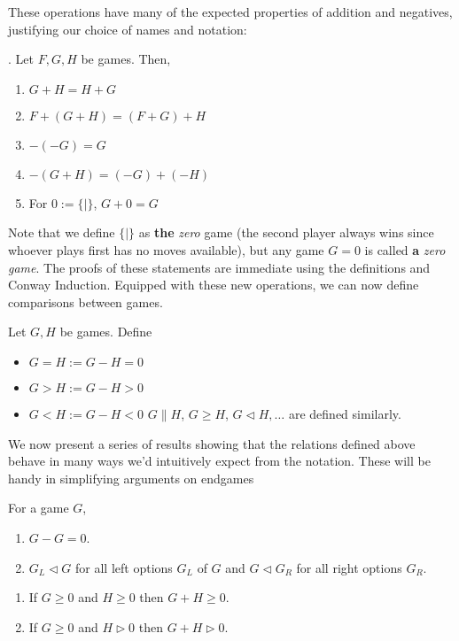 \documentclass[../math194_paper.tex]{subfiles}
\begin{document}
These operations have many of the expected properties of addition and negatives, justifying 
our choice of names and notation:
\begin{theorem}. Let $F,G,H$ be games. Then,
    \label{additionprop}
    \begin{enumerate}
        \item $G+H = H+G$
        \item $F + (G+H) = (F+G) + H$
        \item $-(-G) = G$
        \item $-(G+H) = (-G) + (-H)$
        \item For $0 := \{|\}$, $G+0=G$
    \end{enumerate}
\end{theorem}
Note that we define $\{ | \}$ as \textbf{the} \textit{zero} game (the second player always wins since 
whoever plays first has no moves available), but any game $G = 0$ is called \textbf{a} \textit{zero game}.
The proofs of these statements are immediate using the definitions and Conway Induction. 
Equipped with these new operations, we can now define comparisons between games.
\begin{definition} Let $G, H$ be games. Define
\begin{itemize}
    \item $G = H := G - H = 0$
    \item $G > H := G - H > 0$
    \item $G < H := G - H < 0$
$G \parallel H$, $G \geq H$, $G \triangleleft H, \ldots$ are defined similarly.
\end{itemize}
\end{definition}

We now present a series of results showing that the relations defined above 
behave in many ways we'd intuitively expect from the notation. These will be 
handy in simplifying arguments on endgames

\begin{theorem} For a game $G$,
    \label{reflexequal}
    \begin{enumerate}
        \item $G -G = 0$.
        \item $G_L \triangleleft G$ for all left options $G_L$ of $G$ and $G \triangleleft G_R$ 
        for all right options $G_R$.
    \end{enumerate}
\end{theorem}

\begin{lemma} \label{addition_ordering} \: 
\begin{enumerate}
    \item If $G \geq 0$ and $H \geq 0$ then $G+H \geq 0$.
    \item If $G \geq 0$ and $H \triangleright 0$ then $G+H \triangleright 0$.
\end{enumerate}
\end{lemma}
\end{document}

